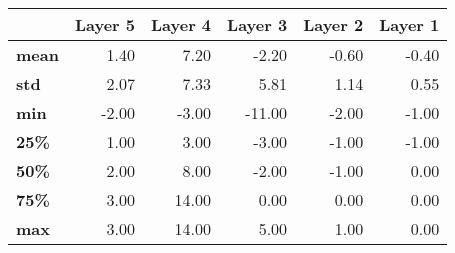 \begin{tabular}{lrrrrr}
\toprule
{} &  Layer 5 &  Layer 4 &  Layer 3 &  Layer 2 &  Layer 1 \\
\midrule
\textbf{mean} &     1.40 &     7.20 &    -2.20 &    -0.60 &    -0.40 \\
\textbf{std } &     2.07 &     7.33 &     5.81 &     1.14 &     0.55 \\
\textbf{min } &    -2.00 &    -3.00 &   -11.00 &    -2.00 &    -1.00 \\
\textbf{25\% } &     1.00 &     3.00 &    -3.00 &    -1.00 &    -1.00 \\
\textbf{50\% } &     2.00 &     8.00 &    -2.00 &    -1.00 &     0.00 \\
\textbf{75\% } &     3.00 &    14.00 &     0.00 &     0.00 &     0.00 \\
\textbf{max } &     3.00 &    14.00 &     5.00 &     1.00 &     0.00 \\
\bottomrule
\end{tabular}
